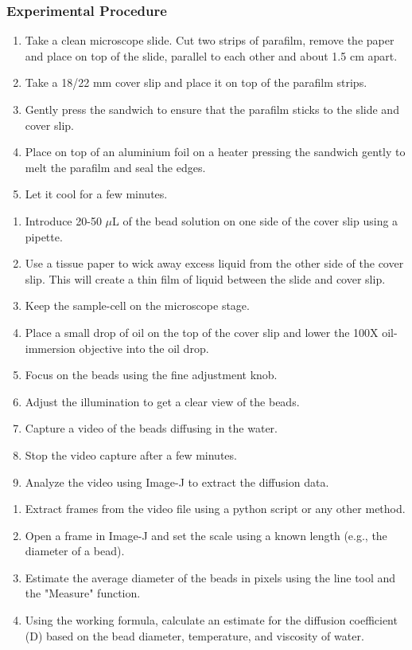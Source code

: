 \documentclass[openany]{book}
\begin{document}
\subsubsection{Experimental Procedure}
\begin{enumerate}
\item Take a clean microscope slide. Cut two strips of parafilm, remove the paper and place on top of the slide, parallel to each other and about 1.5 cm apart.
\item Take a 18/22 mm cover slip and place it on top of the parafilm strips.
\item Gently press the sandwich to ensure that the parafilm sticks to the slide and cover slip.
\item Place on top of an aluminium foil on a heater pressing the sandwich gently to melt the parafilm and seal the edges.
\item Let it cool for a few minutes.
\end{enumerate}
\begin{enumerate}
    \item Introduce 20-50 $\mu$L of the bead solution on one side of the cover slip using a pipette.
    \item Use a tissue paper to wick away excess liquid from the other side of the cover slip. This will create a thin film of liquid between the slide and cover slip.
    \item Keep the sample-cell on the microscope stage. 
    \item Place a small drop of oil on the top of the cover slip and lower the 100X oil-immersion objective into the oil drop.
    \item Focus on the beads using the fine adjustment knob.
    \item Adjust the illumination to get a clear view of the beads.
    \item Capture a video of the beads diffusing in the water.
    \item Stop the video capture after a few minutes.
    \item Analyze the video using Image-J to extract the diffusion data.
\end{enumerate}
\begin{enumerate}
\item Extract frames from the video file using a python script or any other method.
\item Open a frame in Image-J and set the scale using a known length (e.g., the diameter of a bead).
\item Estimate the average diameter of the beads in pixels using the line tool and the "Measure" function.
\item Using the working formula, calculate an estimate for the diffusion coefficient (D) based on the bead diameter, temperature, and viscosity of water.
\end{enumerate}
\end{document}
